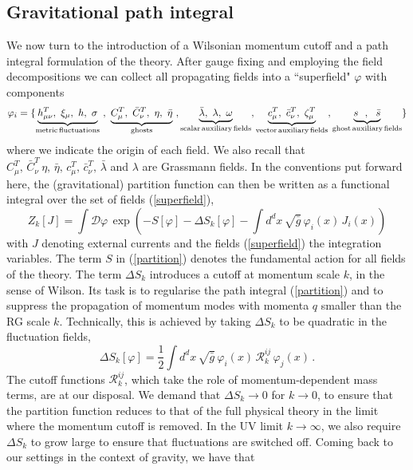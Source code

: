 \documentclass[notitlepage,eqsecnum,bm,amsmath,preprintnumbers,superscriptaddress,nofootinbib,aps,11pt]{revtex4-1}
\def\eq#1{(\ref{#1})}
\def\beq{\begin{equation}}
\def\eeq{\end{equation}}
\begin{document}
\subsection{Gravitational path integral}
We now turn to the introduction of a Wilsonian momentum cutoff and a path integral formulation of the theory.
After gauge fixing and employing the field decompositions we can collect all propagating  fields into a  ``superfield" $\varphi$ with components
\beq \label{superfield}
\varphi_i = \{  
\underbrace{h^T_{\mu\nu},\  \xi_\mu ,\ h,\ \sigma}_{\rm metric \, fluctuations}\ , \ 
\underbrace{C_\mu^T,\ \bar{C}_\nu^T,\  \eta,\  \bar{\eta}}_{\rm ghosts}\ ,      
\underbrace{ \bar{\lambda},\ \lambda,\ \omega}_{\rm scalar\, auxiliary \, fields} ,       
\underbrace{c^T_\mu,\ \bar{c}^T_\nu,\  \zeta^T_\mu}_{\rm vector\, auxiliary \, fields} ,  
\underbrace{ s\ \  ,\ \ \bar{s}}_{\rm ghost \,auxiliary  \,fields}         \}
\eeq
where we indicate the origin of each field. We also recall that $C_\mu^T,\, \bar{C}_\nu^T\,\eta, \, \bar{\eta},\, c^T_\mu,\, \bar{c}^T_\nu,\,\bar{\lambda}$ and $\lambda$ are Grassmann fields. In the conventions put forward here, the (gravitational) partition function can then be written as a functional integral over the set of fields \eq{superfield},
\beq\label{partition}
{Z}_k[J] = \int \mathcal{D}\varphi \, 
\exp\left({-S[\varphi]
-\Delta S_k[\varphi]
-\int d^dx\, \sqrt{\bar g}\,\varphi_i(x)\, J_i(x)}\right)
\eeq
with $J$ denoting external currents and the fields \eq{superfield} the integration variables.  The term $S$ in \eq{partition} denotes the fundamental action for all fields of the theory. The term $\Delta S_k$ introduces a cutoff at momentum scale $k$, in the sense of Wilson. Its task is to regularise the path integral \eq{partition} and to suppress the propagation of momentum modes with momenta $q$ smaller than the RG scale $k$. Technically, this is achieved by taking $\Delta S_k$ to be quadratic in the fluctuation fields,
\beq\label{cutoff}
\Delta S_k[\varphi]=\frac{1}{2}\int d^dx \, \sqrt{\bar g}\,\varphi_i(x)\,
\mathcal{R}^{ij}_k
\,\varphi_j(x)\,.
\eeq
The  cutoff functions $\mathcal{R}^{ij}_k
$, which take the role of momentum-dependent mass terms, are at our disposal.
We demand that $\Delta S_k \to 0$ for $k\to 0$, to ensure that the partition function reduces to that of the full  physical theory in the limit where the momentum cutoff is removed. In the UV limit $k\to \infty$, we also require $\Delta S_k$  to grow large to ensure that fluctuations are switched off.
Coming back to  our  settings in the context of gravity, we have that
\end{document}
